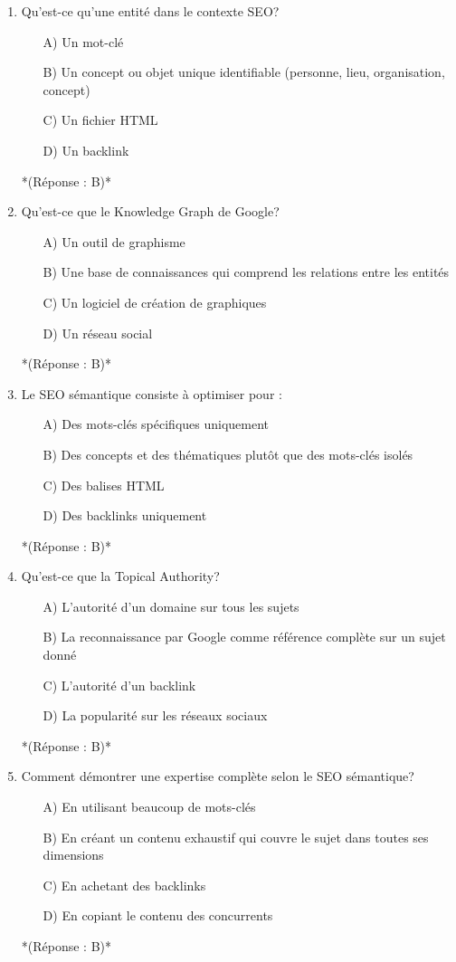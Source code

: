 \documentclass[12pt,a4paper,twoside]{report}
\begin{document}
\begin{enumerate}
\item Qu'est-ce qu'une entité dans le contexte SEO?
\begin{itemize}
\item[A)] Un mot-clé
\item[B)] Un concept ou objet unique identifiable (personne, lieu, organisation, concept)
\item[C)] Un fichier HTML
\item[D)] Un backlink
\end{itemize}
*(Réponse : B)*

\item Qu'est-ce que le Knowledge Graph de Google?
\begin{itemize}
\item[A)] Un outil de graphisme
\item[B)] Une base de connaissances qui comprend les relations entre les entités
\item[C)] Un logiciel de création de graphiques
\item[D)] Un réseau social
\end{itemize}
*(Réponse : B)*

\item Le SEO sémantique consiste à optimiser pour :
\begin{itemize}
\item[A)] Des mots-clés spécifiques uniquement
\item[B)] Des concepts et des thématiques plutôt que des mots-clés isolés
\item[C)] Des balises HTML
\item[D)] Des backlinks uniquement
\end{itemize}
*(Réponse : B)*

\item Qu'est-ce que la Topical Authority?
\begin{itemize}
\item[A)] L'autorité d'un domaine sur tous les sujets
\item[B)] La reconnaissance par Google comme référence complète sur un sujet donné
\item[C)] L'autorité d'un backlink
\item[D)] La popularité sur les réseaux sociaux
\end{itemize}
*(Réponse : B)*

\item Comment démontrer une expertise complète selon le SEO sémantique?
\begin{itemize}
\item[A)] En utilisant beaucoup de mots-clés
\item[B)] En créant un contenu exhaustif qui couvre le sujet dans toutes ses dimensions
\item[C)] En achetant des backlinks
\item[D)] En copiant le contenu des concurrents
\end{itemize}
*(Réponse : B)*


\end{enumerate}
\end{document}
